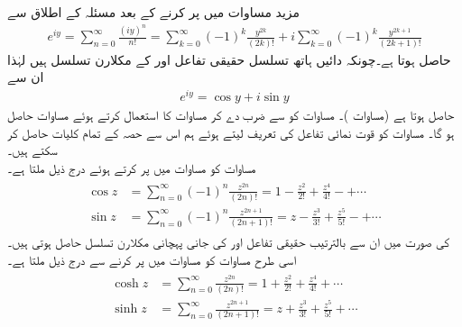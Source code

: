 مزید مساوات  میں  پر کرنے کے بعد مسئلہ  کے اطلاق سے
\begin{align*}
e^{iy}=\sum\limits_{n=0}^{\infty} \frac{(iy)^n}{n!}=\sum\limits_{k=0}^{\infty}(-1)^k\frac{y^{2k}}{(2k)!}+i\sum\limits_{k=0}^{\infty}(-1)^k\frac{y^{2k+1}}{(2k+1)!}
\end{align*}
حاصل ہوتا ہے۔چونکہ دائیں ہاتھ تسلسل  حقیقی تفاعل  اور  کے مکلارن تسلسل ہیں لہٰذا ان سے 
\begin{align}\label{مساوات_ٹیلر_یولر_کلیہ}
e^{iy}=\cos y+i\sin y
\end{align}
حاصل ہوتا ہے (مساوات )۔ مساوات  کو  سے ضرب دے کر مساوات  کا استعمال کرتے ہوئے مساوات  حاصل ہو گا۔ مساوات  کو قوت نمائی تفاعل کی تعریف  لیتے ہوئے ہم اس سے حصہ  کے تمام کلیات حاصل کر سکتے ہیں۔
\quad {}\\
مساوات  کو مساوات  میں پر کرتے ہوئے درج ذیل ملتا ہے۔
\begin{gather}
\begin{aligned}\label{مساوات_ٹیلر_تکونیاتی_تفاعل}
\cos z&=\sum\limits_{n=0}^{\infty} (-1)^n\frac{z^{2n}}{(2n)!}=1-\frac{z^2}{2!}+\frac{z^4}{4!}-+\cdots\\
\sin z&=\sum\limits_{n=0}^{\infty} (-1)^n\frac{z^{2n+1}}{(2n+1)!}=z-\frac{z^3}{3!}+\frac{z^5}{5!}-+\cdots
\end{aligned}
\end{gather}
 کی صورت میں ان سے بالترتیب حقیقی تفاعل  اور  کی جانی پہچانی مکلارن تسلسل حاصل ہوتی ہیں۔اسی طرح مساوات  کو مساوات  میں پر کرنے سے درج ذیل ملتا ہے۔
\begin{gather}
\begin{aligned}\label{مساوات_ٹیلر_ہذلولی_تفاعل}
\cosh z&=\sum\limits_{n=0}^{\infty} \frac{z^{2n}}{(2n)!}=1+\frac{z^2}{2!}+\frac{z^4}{4!}+\cdots\\
\sinh z&=\sum\limits_{n=0}^{\infty} \frac{z^{2n+1}}{(2n+1)!}=z+\frac{z^3}{3!}+\frac{z^5}{5!}+\cdots
\end{aligned}
\end{gather}

